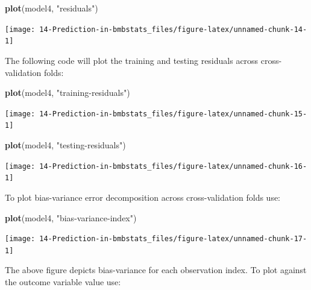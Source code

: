 \documentclass[
]{book}
\newenvironment{Shaded}{\begin{snugshade}}{\end{snugshade}}
\newcommand{\KeywordTok}[1]{\textcolor[rgb]{0.13,0.29,0.53}{\textbf{#1}}}
\newcommand{\NormalTok}[1]{#1}
\newcommand{\StringTok}[1]{\textcolor[rgb]{0.31,0.60,0.02}{#1}}
\begin{document}
\begin{Shaded}
\begin{Highlighting}[]
\KeywordTok{plot}\NormalTok{(model4, }\StringTok{"residuals"}\NormalTok{)}
\end{Highlighting}
\end{Shaded}

\begin{center}\texttt{[image: 14-Prediction-in-bmbstats\_files/figure-latex/unnamed-chunk-14-1]} \end{center}

The following code will plot the training and testing residuals across cross-validation folds:

\begin{Shaded}
\begin{Highlighting}[]
\KeywordTok{plot}\NormalTok{(model4, }\StringTok{"training{-}residuals"}\NormalTok{)}
\end{Highlighting}
\end{Shaded}

\begin{center}\texttt{[image: 14-Prediction-in-bmbstats\_files/figure-latex/unnamed-chunk-15-1]} \end{center}

\begin{Shaded}
\begin{Highlighting}[]
\KeywordTok{plot}\NormalTok{(model4, }\StringTok{"testing{-}residuals"}\NormalTok{)}
\end{Highlighting}
\end{Shaded}

\begin{center}\texttt{[image: 14-Prediction-in-bmbstats\_files/figure-latex/unnamed-chunk-16-1]} \end{center}

To plot bias-variance error decomposition across cross-validation folds use:

\begin{Shaded}
\begin{Highlighting}[]
\KeywordTok{plot}\NormalTok{(model4, }\StringTok{"bias{-}variance{-}index"}\NormalTok{)}
\end{Highlighting}
\end{Shaded}

\begin{center}\texttt{[image: 14-Prediction-in-bmbstats\_files/figure-latex/unnamed-chunk-17-1]} \end{center}

The above figure depicts bias-variance for each observation index. To plot against the outcome variable value use:
\end{document}
